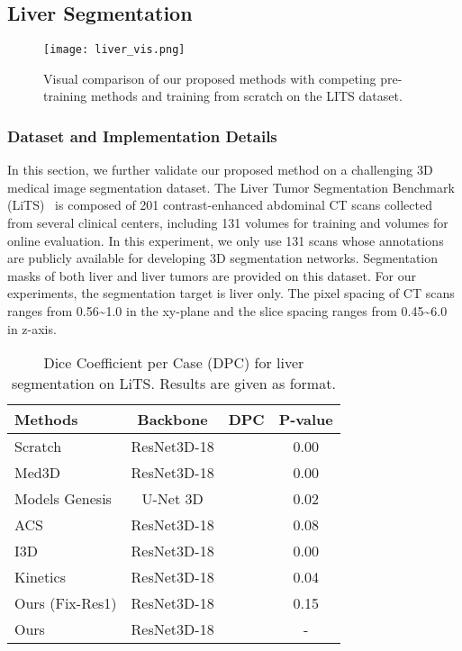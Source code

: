 \documentclass[journal,twoside,web]{ieeecolor}
\begin{document}
\subsection{Liver Segmentation}

\begin{figure*}\centering
	\texttt{[image: liver\_vis.png]}
	\caption{Visual comparison of our proposed methods with competing pre-training methods and training from scratch on the LITS dataset.}
	\label{livervis}
\end{figure*}


\subsubsection{Dataset and Implementation Details}
In this section, we further validate our proposed method on a challenging 3D medical image segmentation dataset. The Liver Tumor Segmentation Benchmark (LiTS)~\cite{bilic2019liver} is composed of 201 contrast-enhanced abdominal CT scans collected from several clinical centers, including 131 volumes for training and volumes for online evaluation. In this experiment, we only use 131 scans whose annotations are publicly available for developing 3D segmentation networks. Segmentation masks of both liver and liver tumors are provided on this dataset. For our experiments, the segmentation target is liver only. The pixel spacing of CT scans ranges from 0.56\textasciitilde1.0  in the xy-plane and the slice spacing ranges from 0.45\textasciitilde6.0  in z-axis.

\begin{table}\centering
    \setlength{\belowcaptionskip}{5pt}
    \caption{Dice Coefficient per Case (DPC) for liver segmentation on LiTS. Results are given as  format.}
    \label{LITS-SEG}
\footnotesize \setlength{\tabcolsep}{11pt}\renewcommand{\arraystretch}{1.0}\begin{tabular}{lccc}
    \toprule
        Methods & Backbone & DPC & P-value \\ \midrule
        Scratch & ResNet3D-18 &  & 0.00 \\         
        Med3D & ResNet3D-18 &  &  0.00  \\ 
        Models Genesis & U-Net 3D &  & 0.02 \\
        ACS & ResNet3D-18 &   & 0.08\\ 
        I3D & ResNet3D-18 &   & 0.00\\ 
        Kinetics & ResNet3D-18 &  & 0.04\\ \midrule
        Ours (Fix-Res1) & ResNet3D-18 &  & 0.15 \\
        Ours & ResNet3D-18 &  & -\\ \bottomrule

    \end{tabular}
\end{table}
\end{document}
